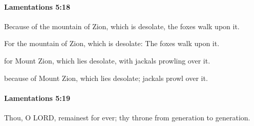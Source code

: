 		\paragraph{Lamentations 5:18} %
			\label{LAMENTATIONS-5-18}

			Because of the mountain of Zion, which is desolate, the foxes walk upon it.

			\begin{versebox}
					\item[BHS] 
					\item[LXX] 
					\item[ASV] For the mountain of Zion, which is desolate: The foxes walk upon it.
					\item[NIV] for Mount Zion, which lies desolate, with jackals prowling over it.
					\item[NRSV] because of Mount Zion, which lies desolate; jackals prowl over it.
			\end{versebox}

		\paragraph{Lamentations 5:19} %
			\label{LAMENTATIONS-5-19}

			Thou, O LORD, remainest for ever; thy throne from generation to generation.


